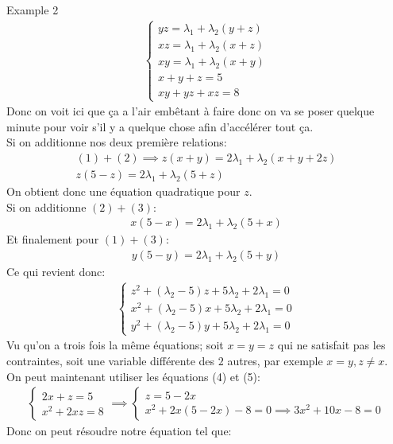 \begin{parag}{Example 2}
\begin{align*}
    \begin{cases}
        yz =  \lambda_1 + \lambda_2 \left(y + z\right)\\
        xz =  \lambda_1 + \lambda_2\left(x + z\right)\\
        xy =  \lambda_1 + \lambda_2\left(x + y\right)\\
        x + y + z = 5\\
        xy + yz + xz =  8
    \end{cases}
\end{align*}
Donc on voit ici que ça a l'air embêtant à faire donc on va se poser quelque minute pour voir s'il y a quelque chose afin d'accélérer tout ça.\\
Si on additionne nos deux première relations: 
\begin{align*} \left(1\right) + \left(2\right) \implies z\left(x + y\right) =  2\lambda_1 + \lambda_2\left(x + y + 2z\right)\\
    z\left(5-z\right) =  2\lambda_1 + \lambda_2\left(5 + z\right)
\end{align*}
On obtient donc une équation quadratique pour $z$.\\
Si on additionne $\left(2\right) + \left(3\right)$:
\begin{align*} x\left(5-x\right) =  2\lambda_1 + \lambda_2\left(5 + x\right) \end{align*}
Et finalement pour $\left(1\right) + \left(3\right)$:
\begin{align*} y\left(5-y\right) = 2\lambda_1 + \lambda_2\left(5 + y\right) \end{align*}
Ce qui revient donc:
\begin{align*} 
    \begin{cases}
        z^2 + \left(\lambda_2 - 5\right)z + 5\lambda_2 + 2\lambda_1 =  0\\
        x^2 + \left(\lambda_2 - 5\right)x + 5\lambda_2 + 2\lambda_1 = 0\\
        y^2 + \left(\lambda_2 - 5\right) y + 5\lambda_2 + 2\lambda_1 = 0
    \end{cases}
\end{align*}
Vu qu'on a trois fois la même équations; soit $x= y= z$ qui ne satisfait pas les contraintes, soit une variable différente des $2$ autres, par exemple $x =  y, z \neq x$.\\
On peut maintenant utiliser les équations (4) et (5):
\begin{align*} 
    \begin{cases}
        2x + z =  5\\
        x^2 + 2xz =  8
        \end{cases} \implies \begin{cases} z = 5 - 2x\\ x^2 + 2x\left(5-2x\right) - 8 =  0 \implies 3x^2 + 10x - 8 = 0\end{cases}
\end{align*}
Donc on peut résoudre notre équation tel que:


\end{parag}
